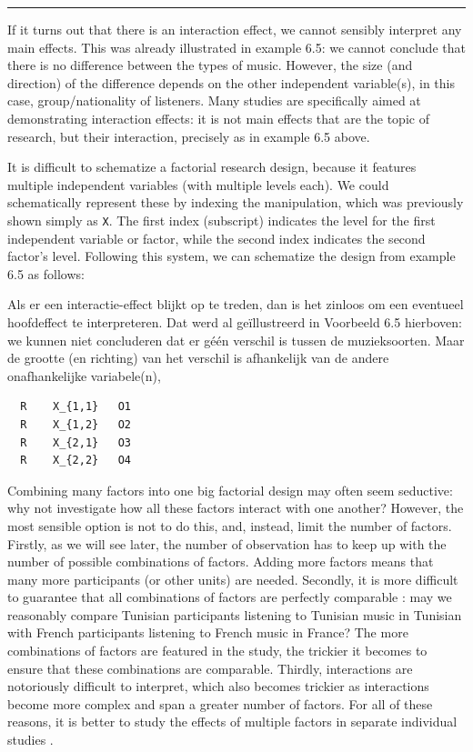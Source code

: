 \documentclass[
]{book}
\begin{document}
\begin{center}\rule{0.5\linewidth}{0.5pt}\end{center}

If it turns out that there is an interaction effect, we cannot sensibly interpret any main effects. This was already illustrated in example 6.5: we cannot conclude that there is no difference between the types of music. However, the size (and direction) of the difference depends on the other independent variable(s), in this case, group/nationality of listeners. Many studies are specifically aimed at demonstrating interaction effects: it is not main effects that are the topic of research, but their interaction, precisely as in example 6.5 above.

It is difficult to schematize a factorial research design, because it features multiple independent variables (with multiple levels each). We could schematically represent these by indexing the manipulation, which was previously shown simply as \texttt{X}. The first index (subscript) indicates the level for the first independent variable or factor, while the second index indicates the second factor's level. Following this system, we can schematize the design from example 6.5 as follows:

Als er een interactie-effect blijkt op te treden, dan is het zinloos om
een eventueel hoofdeffect te interpreteren. Dat werd al geïllustreerd in
Voorbeeld 6.5 hierboven: we kunnen niet concluderen dat er géén
verschil is tussen de muzieksoorten. Maar de grootte (en richting) van
het verschil is afhankelijk van de andere onafhankelijke variabele(n),

\begin{verbatim}
  R    X_{1,1}   O1
  R    X_{1,2}   O2
  R    X_{2,1}   O3
  R    X_{2,2}   O4
\end{verbatim}

Combining many factors into one big factorial design may often seem seductive: why not investigate how all these factors interact with one another? However, the most sensible option is not to do this, and, instead, limit the number of factors. Firstly, as we will see later, the number of observation has to keep up with the number of possible combinations of factors. Adding more factors means that many more participants (or other units) are needed. Secondly, it is more difficult to guarantee that all combinations of factors are perfectly comparable \citep[p.266]{SCC02}: may we reasonably compare Tunisian participants listening to Tunisian music in Tunisian with French participants listening to French music in France? The more combinations of factors are featured in the study, the trickier it becomes to ensure that these combinations are comparable. Thirdly, interactions are notoriously difficult to interpret, which also becomes trickier as interactions become more complex and span a greater number of factors. For all of these reasons, it is better to study the effects of multiple factors in separate individual studies \citep{Quene10}.
\end{document}
